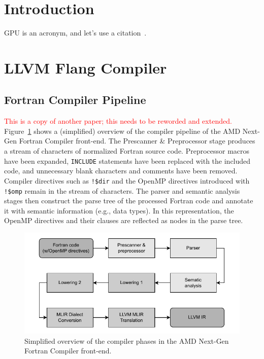 \documentclass[acmtog,natbib=false]{acmart}
\newcommand{\todo}[1]{\textcolor{red}{#1}}
\newcommand{\code}[1]{\texttt{#1}\xspace}
\begin{document}


\maketitle

\section{Introduction}
\label{sec:Introduction}
\Ac{GPU} is an acronym, and let's use a citation~\cite{AMD24}.

\section{LLVM Flang Compiler}
\label{sec:LLVMFlangCompiler}

\subsection{Fortran Compiler Pipeline}
\label{sec:FortranCompilerPipeline}
\todo{This is a copy of another paper; this needs to be reworded and extended.}
Figure~\ref{fig:FlangCompilerPhases} shows a (simplified) overview of the compiler pipeline of the AMD Next-Gen Fortran Compiler front-end.
The Prescanner \& Preprocessor stage produces a stream of characters of normalized Fortran source code. 
Preprocessor macros have been expanded, \code{INCLUDE} statements have been replaced with the included code, and unnecessary blank characters and comments have been removed.
Compiler directives such as \code{!\$dir} and the OpenMP directives introduced with \code{!\$omp} remain in the stream of characters.
The parser and semantic analysis stages then construct the parse tree of the processed Fortran code and annotate it with semantic information (e.g., data types).
In this representation, the OpenMP directives and their clauses are reflected as nodes in the parse tree.

\begin{figure}[t]
    \centering
    \includegraphics[width=\linewidth]{figures/flang_compiler_phases_overview.pdf}
    \caption{Simplified overview of the compiler phases in the AMD Next-Gen Fortran Compiler front-end.\label{fig:FlangCompilerPhases}}
\end{figure}
\end{document}
